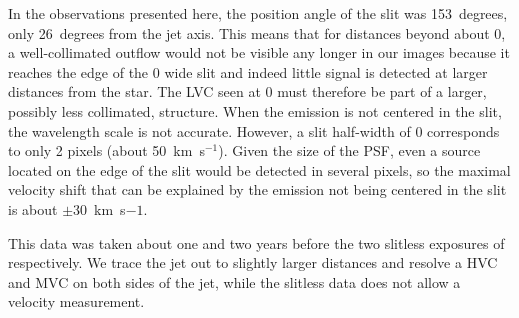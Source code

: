 \documentclass[twocolumn,trackchanges]{aastex63}
\begin{document}
In the observations presented here, the position angle of the slit was 153~degrees, only 26~degrees from the jet axis. This means that for distances beyond about 0, a well-collimated outflow would not be visible any longer in our images because it reaches the edge of the 0 wide slit and indeed little signal is detected at larger distances from the star. The LVC seen at 0 must therefore be part of a larger, possibly less collimated, structure. When the emission is not centered in the slit, the wavelength scale is not accurate. However, a slit half-width of 0 corresponds to only 2 pixels (about 50~km~s$^{-1}$). Given the size of the PSF, even a source located on the edge of the slit would be detected in several pixels, so the maximal velocity shift that can be explained by the emission not being centered in the slit is about $\pm30$~km~s${-1}$.

This data was taken about one and two years before the two slitless exposures of \citet{2004ApJ...609..261H} respectively. We trace the jet out to slightly larger distances and resolve a HVC and MVC on both sides of the jet, while the slitless data does not allow a velocity measurement.
\end{document}
